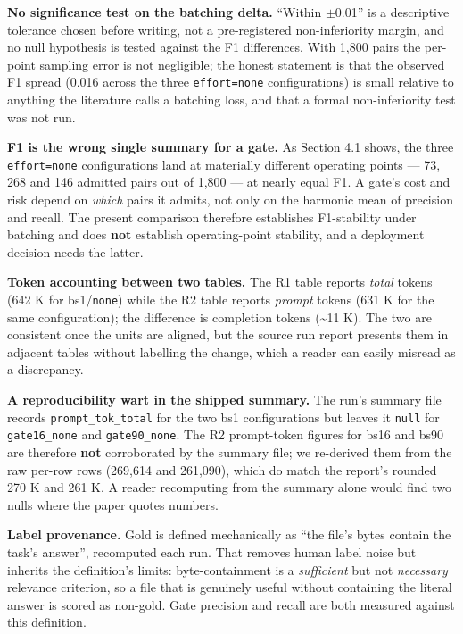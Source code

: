 \documentclass[11pt,a4paper]{article}
\begin{document}
\textbf{No significance test on the batching delta.} ``Within $\pm$0.01'' is a descriptive tolerance chosen before writing, not a pre-registered non-inferiority margin, and no null hypothesis is tested against the F1 differences. With 1,800 pairs the per-point sampling error is not negligible; the honest statement is that the observed F1 spread (0.016 across the three \texttt{effort=none} configurations) is small relative to anything the literature calls a batching loss, and that a formal non-inferiority test was not run.

\textbf{F1 is the wrong single summary for a gate.} As Section 4.1 shows, the three \texttt{effort=none} configurations land at materially different operating points --- 73, 268 and 146 admitted pairs out of 1,800 --- at nearly equal F1. A gate's cost and risk depend on \emph{which} pairs it admits, not only on the harmonic mean of precision and recall. The present comparison therefore establishes F1-stability under batching and does \textbf{not} establish operating-point stability, and a deployment decision needs the latter.

\textbf{Token accounting between two tables.} The R1 table reports \emph{total} tokens (642 K for bs1/\texttt{none}) while the R2 table reports \emph{prompt} tokens (631 K for the same configuration); the difference is completion tokens (\textasciitilde{}11 K). The two are consistent once the units are aligned, but the source run report presents them in adjacent tables without labelling the change, which a reader can easily misread as a discrepancy.

\textbf{A reproducibility wart in the shipped summary.} The run's summary file records \texttt{prompt\_tok\_total} for the two bs1 configurations but leaves it \texttt{null} for \texttt{gate16\_none} and \texttt{gate90\_none}. The R2 prompt-token figures for bs16 and bs90 are therefore \textbf{not} corroborated by the summary file; we re-derived them from the raw per-row rows (269,614 and 261,090), which do match the report's rounded 270 K and 261 K. A reader recomputing from the summary alone would find two nulls where the paper quotes numbers.

\textbf{Label provenance.} Gold is defined mechanically as ``the file's bytes contain the task's answer'', recomputed each run. That removes human label noise but inherits the definition's limits: byte-containment is a \emph{sufficient} but not \emph{necessary} relevance criterion, so a file that is genuinely useful without containing the literal answer is scored as non-gold. Gate precision and recall are both measured against this definition.
\end{document}
